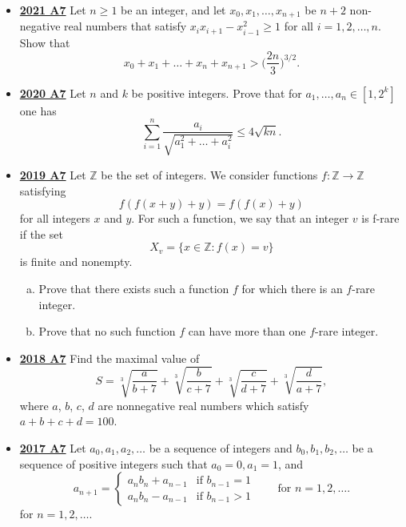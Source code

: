 \documentclass[11pt]{scrartcl}
\begin{document}
\begin{itemize}[leftmargin=*]
\item \href{https://artofproblemsolving.com/community/c6h2882578p25627708}{\textbf{2021 A7}} Let $n\geqslant  1$ be an integer, and let $x_0,x_1,\dots,x_{n+1}$ be $n+2$ non-negative real numbers that satisfy $x_ix_{i+1}-x_{i-1}^2\geqslant  1$ for all $i=1,2,\dots,n.$ Show that\[x_0+x_1+\dots+x_n+x_{n+1}>\bigg(\frac{2n}{3}\bigg)^{3/2}.\]
\item \href{https://artofproblemsolving.com/community/c6h2625876p22698187}{\textbf{2020 A7}} Let $n$ and $k$ be positive integers. Prove that for $a_1, \dots, a_n \in [1,2^k]$ one has
\[ \sum_{i = 1}^n \frac{a_i}{\sqrt{a_1^2 + \dots + a_i^2}} \leqslant 4 \sqrt{kn}. \]
\newpage

\item \href{https://artofproblemsolving.com/community/c6h2278978p17828524}{\textbf{2019 A7}} Let $\mathbb Z$ be the set of integers. We consider functions $f :\mathbb Z\to\mathbb Z$ satisfying
\[f\left(f(x+y)+y\right)=f\left(f(x)+y\right)\]for all integers $x$ and $y$. For such a function, we say that an integer $v$ is f-rare if the set
\[X_v=\{x\in\mathbb Z:f(x)=v\}\]is finite and nonempty. 
\begin{enumerate}[(a)]
    \item Prove that there exists such a function $f$ for which there is an $f$-rare integer. 
    \item Prove that no such function $f$ can have more than one $f$-rare integer.
\end{enumerate}
\item \href{https://artofproblemsolving.com/community/c6h1876747p12752777}{\textbf{2018 A7}} Find the maximal value of
\[S = \sqrt[3]{\frac{a}{b+7}} + \sqrt[3]{\frac{b}{c+7}} + \sqrt[3]{\frac{c}{d+7}} + \sqrt[3]{\frac{d}{a+7}},\]where $a$, $b$, $c$, $d$ are nonnegative real numbers which satisfy $a+b+c+d = 100$.
\item \href{https://artofproblemsolving.com/community/c6h1671327p10632648}{\textbf{2017 A7}} Let $a_0,a_1,a_2,\dots$ be a sequence of integers and $b_0,b_1,b_2,\dots$ be a sequence of positive integers such that $a_0=0,a_1=1$, and
\[
a_{n+1} =
        \begin{cases}
            a_nb_n+a_{n-1} & \text{if $b_{n-1}=1$} \\
            a_nb_n-a_{n-1} & \text{if $b_{n-1}>1$}
        \end{cases}\qquad\text{for }n=1,2,\dots.
\]for $n=1,2,\dots$.


\end{itemize}
\end{document}

